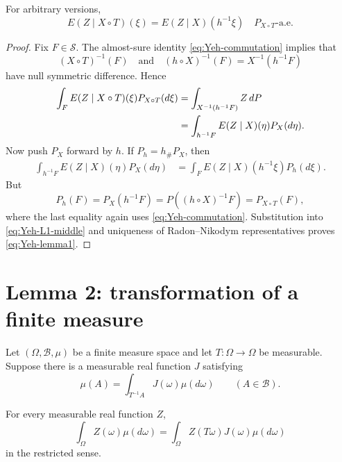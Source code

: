 \begin{lemma}\label{lem:Yeh-1}
For arbitrary versions,
\begin{equation}\label{eq:Yeh-lemma1}
 E(Z\mid X\circ T)(\xi)
 =E(Z\mid X)(h^{-1}\xi)
 \quad P_{X\circ T}\text{-a.e.}
\end{equation}
\end{lemma}

\begin{proof}
Fix $F\in\mathcal S$.  The almost-sure identity \eqref{eq:Yeh-commutation} implies that
\[
 (X\circ T)^{-1}(F)
 \quad\text{and}\quad
 (h\circ X)^{-1}(F)=X^{-1}(h^{-1}F)
\]
have null symmetric difference.  Hence
\begin{align}
 \int_FE(Z\mid X\circ T)(\xi)P_{X\circ T}(d\xi)
 &=\int_{X^{-1}(h^{-1}F)}Z\,dP\notag\\
 &=\int_{h^{-1}F}E(Z\mid X)(\eta)P_X(d\eta).\label{eq:Yeh-L1-middle}
\end{align}
Now push $P_X$ forward by $h$.  If $P_h=h_\#P_X$, then
\begin{align*}
 \int_{h^{-1}F}E(Z\mid X)(\eta)P_X(d\eta)
 &=\int_FE(Z\mid X)(h^{-1}\xi)P_h(d\xi).
\end{align*}
But
\[
 P_h(F)=P_X(h^{-1}F)=P((h\circ X)^{-1}F)=P_{X\circ T}(F),
\]
where the last equality again uses \eqref{eq:Yeh-commutation}.  Substitution into \eqref{eq:Yeh-L1-middle} and uniqueness of Radon--Nikodym representatives proves \eqref{eq:Yeh-lemma1}.
\end{proof}

\section{Lemma 2: transformation of a finite measure}
Let $(\Omega,\mathcal B,\mu)$ be a finite measure space and let $T:\Omega\to\Omega$ be measurable.  Suppose there is a measurable real function $J$ satisfying
\begin{equation}\label{eq:Yeh-density}
 \mu(A)=\int_{T^{-1}A}J(\omega)\mu(d\omega)
 \qquad(A\in\mathcal B).
\end{equation}

\begin{lemma}\label{lem:Yeh-2}
For every measurable real function $Z$,
\begin{equation}\label{eq:Yeh-change}
 \int_\Omega Z(\omega)\mu(d\omega)
 =\int_\Omega Z(T\omega)J(\omega)\mu(d\omega)
\end{equation}
in the restricted sense.
\end{lemma}

